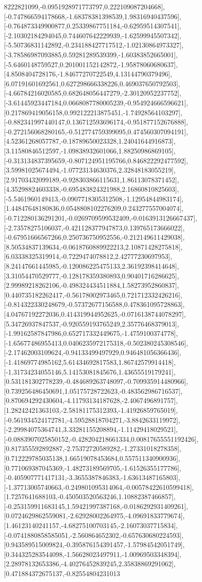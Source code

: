 \documentclass{article}
\begin{document}
8222821099,-0.0951928971773797,0.222109087204668],[-0.747866594178668,-1.68378381398539,1.98316940437596],[-0.764873349900877,0.25339867751184,-0.62959514307541],[-2.10302184294045,0.744607642229939,-1.62599945507342],[-5.50736831142892,-0.234188427717512,-1.02130864973327],[-3.78586987093885,0.59281289539399,-1.60383852665001],[-5.6460148759527,0.201001152142872,-1.95878060680637],[4.8508404728176,-1.84677270722549,4.13144790379496],[6.07191601692561,0.627298666338226,0.469037650792503],[-4.66784216020585,0.682648056447279,-2.30120952237752],[-3.61445923447184,0.0668087780005239,-0.954924666596621],[0.217869419056158,0.992122213875451,-1.74928564103297],[-0.882341997440147,0.136712593696174,-0.951877152676888],[-0.272156068280165,-0.512774759399095,0.474560307094191],[4.52361268057787,-0.18789650023328,1.24041644916873],[3.11580846512597,-1.09838932601066,1.88250986869105],[-0.313134837395659,-0.807124951195766,0.846822292477592],[3.59981025674494,-1.07723134630376,2.32848183055219],[2.91703432099189,-0.928303866115631,1.86113078371452],[4.35298824603338,-0.695483824321988,2.16860810825603],[-5.5461960149413,-0.0907718305312508,-1.12954844983174],[1.44847648180836,0.0548808102276209,0.243277557004074],[-0.712280136291201,-0.0269709599532409,-0.0163913126667437],[-2.73578275106037,-0.421128377947873,0.139765173666022],[-0.67951666567266,0.250736750952556,-0.212149611429038],[8.50534837139634,-0.0618760889922213,2.10871428275818],[6.03338325319914,-0.7229474078812,2.42777230697953],[8.24147661445985,-0.120086225475133,2.36192398414648],[3.31054470529777,-0.128178359380893,0.90401716286625],[2.99989218262106,-0.498324434511884,1.58273952860837],[0.440735182262417,-0.56178002973465,0.721712332426216],[-0.814322330248679,-0.57372677156588,0.478361095728863],[4.04767192272036,0.414319944952625,-0.0716138744078297],[5.34726937847537,-0.920559193765249,2.35776468379013],[-1.99162587847986,0.652717332449675,-1.4759100374778],[-1.65677486955413,0.0406235972175318,-0.502380245308546],[-2.17462003109624,-0.94133499497929,0.946481056366436],[-1.41869774985162,5.61434692817583,1.86742579914418],[-1.31734234055146,5.14153081845676,1.43655519179241],[0.531181302778239,-0.484689263748097,-0.709935914480966],[0.739256486450691,1.05175728722623,-0.483562986716537],[0.870694292430604,-4.11793134187628,-2.4067496891757],[1.28242421363103,-2.58181175312393,-1.41926859765019],[-0.561934524172781,-4.59528818704271,-3.8842633119972],[-2.29984075364741,3.33281155208894,-1.11429418029521],[-0.0883907025850152,-0.428204218661334,0.00817655551192426],[0.817355592892887,-2.75372720589282,-1.27331018278358],[0.712229785035138,1.66519078453684,0.557511340900936],[0.771069387045369,-1.48273189569705,-1.61526355177786],[-0.405907771417131,-3.3655387846383,-1.63613487165803],[-1.37713005740663,-0.249801095314064,-0.00578422610599418],[1.7257641688103,-0.450503520563246,1.10882387466857],[-0.253159911683145,1.59421997387168,-0.0186292931409261],[0.0724629862559081,-2.62928002264975,-4.09691833779674],[1.46123140241157,-4.68275100703145,-2.16073037715834],[-0.0741880858585051,-2.560864652302,-0.657630680224593],[0.943589515009824,-0.395876154391457,-1.57984542051749],[0.344325283544098,-1.56628023497911,-1.00969503348394],[2.28978132653386,-4.40276452839245,2.35838869291062],[0.471884372675137,-0.82554804231013
\end{document}
